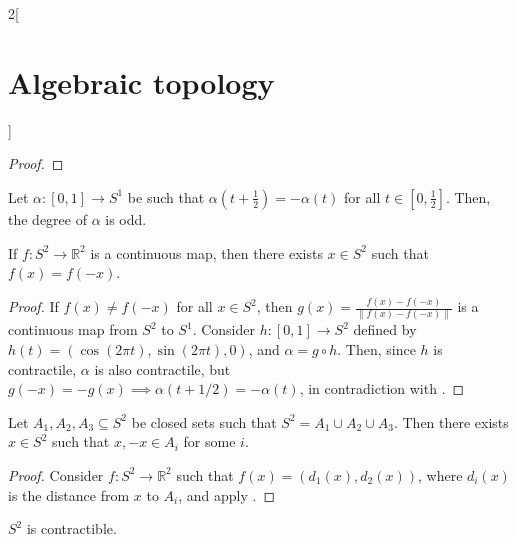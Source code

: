 \documentclass[../../../main_math.tex]{subfiles}
\begin{document}
\begin{multicols}{2}[\section{Algebraic topology}]
\begin{proof}
  \end{proof}

  \begin{lemma} \label{lema Borsuk}
    Let $\alpha:[0,1]\to S^1$ be such that $\alpha(t+\frac{1}{2})=-\alpha(t)$ for all $t\in[0,\frac{1}{2}]$. Then, the degree of $\alpha$ is odd.
  \end{lemma}

  \begin{theorem}
    \label{Borsuk-Ulam}
    If $f:S^2 \to \mathbb{R}^2$ is a continuous map, then there exists $x\in S^2$ such that $f(x)=f(-x)$.
  \end{theorem}

  \begin{proof}
    If $f(x)\neq f(-x)$ for all $x\in S^2$, then $g(x)=\frac{f(x)-f(-x)}{\|f(x)-f(-x)\|}$ is a continuous map from $S^2$ to $S^1$. Consider $h:[0,1] \to S^2$ defined by $h(t)=(\cos(2\pi t), \sin(2\pi t), 0)$, and $\alpha = g \circ h$. Then, since $h$ is contractile, $\alpha$ is also contractile, but $g(-x)=-g(x)\implies \alpha(t+1/2)=-\alpha(t)$, in contradiction with .
  \end{proof}

  \begin{corollary}
    Let $A_1, A_2, A_3\subseteq S^2$ be closed sets such that $S^2=A_1\cup A_2 \cup A_3$. Then there exists $x\in S^2$ such that $x,-x \in A_i$ for some $i$.
  \end{corollary}

  \begin{proof}
    Consider $f: S^2 \to \mathbb{R}^2$ such that $f(x)=(d_1(x), d_2(x))$, where $d_i(x)$ is the distance from $x$ to $A_i$, and apply .
  \end{proof}

  \begin{proposition}
    $S^2$ is contractible.
  \end{proposition}


\end{multicols}
\end{document}
